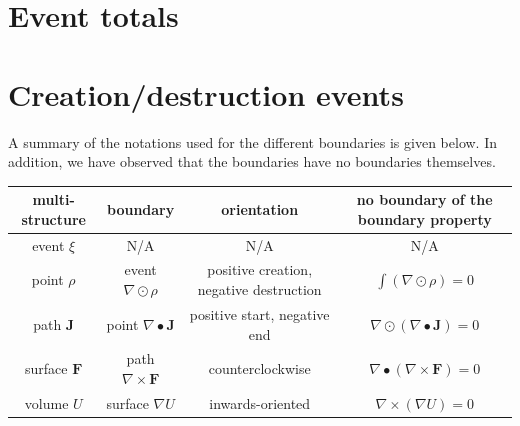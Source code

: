 \vspace{5mm}




\section{Event totals}




\section{Creation/destruction events} 



A summary of the notations used for the different boundaries is given below. In addition, we have observed that the boundaries have no boundaries themselves.

\begin{center}
\begin{tabular}{|c||c|c|c|}
\hline
multi-structure & boundary & orientation & no boundary of the boundary property \\
\hline
\hline
event \(\xi\) & 
N/A & 
N/A & 
N/A \\ 
\hline 
point \(\rho\) &
event \(\nabla \odot \rho\) &
\parbox{0.25\textwidth}{
positive creation, negative destruction
} & 
\(\int (\nabla \odot \rho) = 0\) \\ 
\hline 
path \(\mathbf{J}\) & 
point \(\nabla \bullet \mathbf{J}\) & 
positive start, negative end &
\(\nabla \odot (\nabla \bullet \mathbf{J}) = 0\) \\
\hline
surface \(\mathbf{F}\) & 
path \(\nabla \times \mathbf{F}\) & 
counterclockwise &
\(\nabla \bullet (\nabla \times \mathbf{F}) = 0\) \\
\hline
volume \(U\) & 
surface \(\nabla U\) & 
inwards-oriented & 
\(\nabla \times (\nabla U) = 0\) \\
\hline
\end{tabular}
\end{center}




